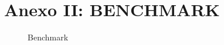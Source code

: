 \chapter{Anexo II: BENCHMARK}

 \begin{figure}[H]
    \centering
    \caption{Benchmark}
    \label{fig:bench}
\end{figure}